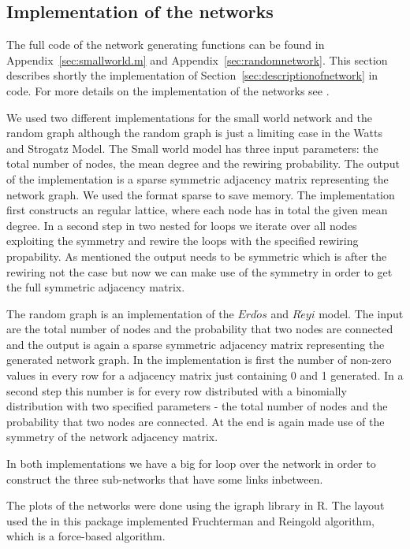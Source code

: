 \subsection{Implementation of the networks}
\label{sec:implementationofnetworks}

The full code of the network generating functions can be found in
Appendix~\ref{sec:smallworld.m} and Appendix~\ref{sec:randomnetwork}. This section describes shortly the implementation of Section~\ref{sec:descriptionofnetwork} in \matlab code. For more details on the implementation of the networks see \cite{BruggerSchwirzer2011}.

We used two different implementations for the small world network and the random graph although the random graph is just a limiting case in the Watts and Strogatz Model. The Small world model has three input parameters: the total number of nodes, the mean degree and the rewiring probability. The output of the implementation is a sparse symmetric adjacency matrix representing the network graph. We used the format sparse to save memory. The implementation first constructs an regular lattice, where each node has in total the given mean degree. In a second step in two nested for loops we iterate over all nodes exploiting the symmetry and rewire the loops with the specified rewiring propability. As mentioned the output needs to be symmetric which is after the rewiring not the case but now we can make use of the symmetry in order to get the full symmetric adjacency matrix.

The random graph is an implementation of the $Erd\acute{o}s$ and $R\acute{e}yi$ model. The input are the total number of nodes and the probability that two nodes are connected and the output is again a sparse symmetric adjacency matrix representing the generated network graph. In the implementation is first the number of non-zero values in every row for a adjacency matrix just containing 0 and 1 generated. In a second step this number is for every row distributed with a binomially distribution with two specified parameters - the total number of nodes and the probability that two nodes are connected. At the end is again made use of the symmetry of the network adjacency matrix.

In both implementations we have a big for loop over the network in order to construct the three sub-networks that have some links inbetween.

The plots of the networks were done using the igraph library in R. The layout used the in this package implemented Fruchterman and Reingold algorithm, which is a force-based algorithm.